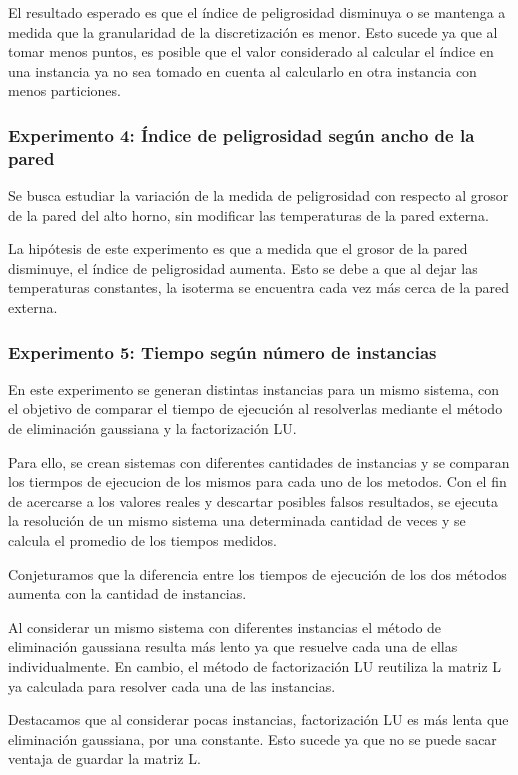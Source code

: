     El resultado esperado es que el índice de peligrosidad disminuya o se mantenga a medida que la granularidad de la discretización es menor. Esto sucede ya que al tomar menos puntos, es posible que el valor considerado al calcular el índice en una instancia ya no sea tomado en cuenta al calcularlo en otra instancia con menos particiones.

    \subsubsection*{Experimento 4: Índice de peligrosidad según ancho de la pared}
    Se busca estudiar la variación de la medida de peligrosidad con respecto al grosor de la pared del alto horno, sin modificar las temperaturas de la pared externa.

    La hipótesis de este experimento es que a medida que el grosor de la pared disminuye, el índice de peligrosidad aumenta. Esto se debe a que al dejar las temperaturas constantes, la isoterma se encuentra cada vez más cerca de la pared externa.

  	\subsubsection*{Experimento 5: Tiempo según número de instancias}
  	En este experimento se generan distintas instancias para un mismo sistema, con el objetivo de comparar el tiempo de ejecución al resolverlas mediante el método de eliminación gaussiana y la factorización LU. 

  	Para ello, se crean sistemas con diferentes cantidades de instancias y se comparan los tiermpos de ejecucion de los mismos para cada uno de los metodos. Con el fin de acercarse a los valores reales y descartar posibles falsos resultados, se ejecuta la resolución de un mismo sistema una determinada cantidad de veces y se calcula el promedio de los tiempos medidos.

    Conjeturamos que la diferencia entre los tiempos de ejecución de los dos métodos aumenta con la cantidad de instancias. 

    Al considerar un mismo sistema con diferentes instancias el método de eliminación gaussiana resulta más lento ya que resuelve cada una de ellas individualmente. En cambio, el método de factorización LU reutiliza la matriz L ya calculada para resolver cada una de las instancias.

    Destacamos que al considerar pocas instancias, factorización LU es más lenta que eliminación gaussiana, por una constante. Esto sucede ya que no se puede sacar ventaja de guardar la matriz L.


